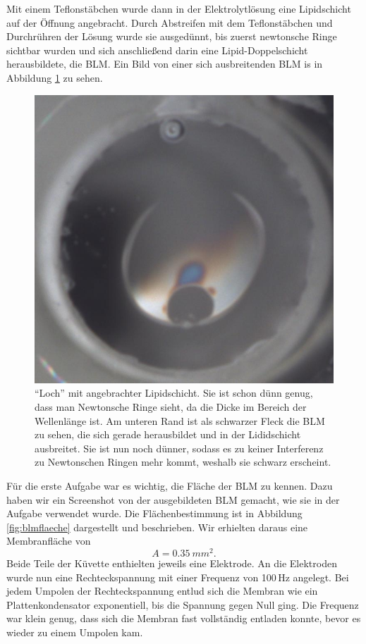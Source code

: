 \documentclass[a4paper,ngerman]{scrartcl}
\begin{document}
Mit einem Teflonstäbchen wurde dann in der Elektrolytlösung eine Lipidschicht auf der Öffnung angebracht. Durch Abstreifen mit dem 
Teflonstäbchen und Durchrühren der Lösung wurde sie ausgedünnt, bis zuerst newtonsche Ringe sichtbar wurden und sich anschließend 
darin eine Lipid-Doppelschicht herausbildete, die BLM. Ein Bild von einer sich ausbreitenden BLM is in Abbildung \ref{fig:newton} zu sehen.

\begin{figure}[tbh!]
  \centering
  \includegraphics[width=.4\textwidth]{abbildungen/newton2_cut.jpg}
  \caption{"`Loch"' mit angebrachter Lipidschicht. Sie ist schon dünn genug, dass man Newtonsche Ringe sieht, da die Dicke im Bereich der Wellenlänge ist. Am unteren Rand ist als schwarzer Fleck die BLM zu sehen, die sich gerade herausbildet und in der Lididschicht ausbreitet.
Sie ist nun noch dünner, sodass es zu keiner Interferenz zu Newtonschen Ringen mehr kommt, weshalb sie schwarz erscheint.}
  \label{fig:newton}
\end{figure}

Für die erste Aufgabe war es wichtig, die Fläche der BLM zu kennen. Dazu haben wir ein Screenshot von der ausgebildeten BLM gemacht, wie sie 
in der Aufgabe verwendet wurde. Die Flächenbestimmung ist in Abbildung \ref{fig:blmflaeche} dargestellt und beschrieben. 
Wir erhielten daraus eine Membranfläche von 
\begin{equation} A = \SI{0,35}{mm^2}.\label{eq:area}\end{equation}
Beide Teile der Küvette enthielten jeweils eine Elektrode. An die Elektroden
wurde nun eine Rechteckspannung mit einer Frequenz von 100\,Hz angelegt. Bei jedem Umpolen der Rechteckspannung entlud sich die Membran wie ein Plattenkondensator exponentiell, bis die Spannung gegen Null ging. Die Frequenz war klein genug, dass sich die Membran fast vollständig entladen konnte, bevor es wieder zu einem Umpolen kam.\\
\end{document}
